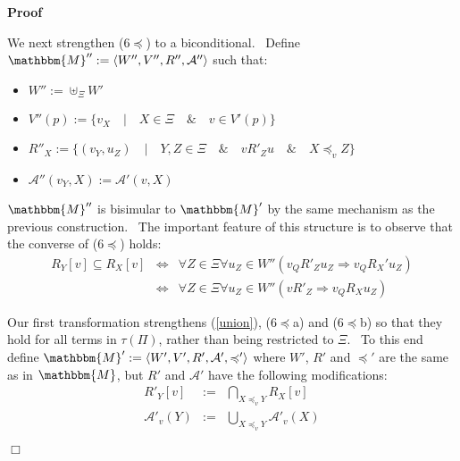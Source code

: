 \documentclass{acmconf}
\newcommand{\assign}{:=}
\newenvironment{itemizedot}{\begin{itemize} \renewcommand{\labelitemi}{$\bullet$}\renewcommand{\labelitemii}{$\bullet$}\renewcommand{\labelitemiii}{$\bullet$}\renewcommand{\labelitemiv}{$\bullet$}}{\end{itemize}}
\newenvironment{proof}{\noindent\textbf{Proof\ }}{\hspace*{\fill}$\Box$\medskip}
\begin{document}
\begin{proof}
  
  
  We next strengthen (6$\preccurlyeq$) to a biconditional. \ Define
  $\mathbbm{M}'' \assign \langle W'', V'', R'', \mathcal{A}'' \rangle$ such
  that:
  \begin{itemizedot}
    \item $W'' \assign \uplus_{\Xi} W'$
    
    \item $V'' (p) \assign \{v_X \hspace{1em} | \hspace{1em} X \in \Xi
    \hspace{1em} \& \hspace{1em} v \in V' (p)\}$
    
    \item $R''_X \assign \{(v_Y, u_Z) \hspace{1em} | \hspace{1em} Y, Z \in \Xi
    \hspace{1em} \& \hspace{1em} v R'_Z u \hspace{1em} \& \hspace{1em} X
    \preccurlyeq_v Z\}$
    
    \item $\mathcal{A}'' (v_Y, X) \assign \mathcal{A}' (v, X)$
  \end{itemizedot}
  $\mathbbm{M}''$ is bisimular to $\mathbbm{M}'$ by the same mechanism as the
  previous construction. \ The important feature of this structure is to
  observe that the converse of (6$\preccurlyeq$) holds:
  \begin{eqnarray*}
    R_Y [v] \subseteq R_X [v] & \Longleftrightarrow & \forall Z \in \Xi
    \forall u_Z \in W'' (v_Q R'_Z u_Z \Longrightarrow v_Q R_X' u_Z)\\
    & \Longleftrightarrow & \forall Z \in \Xi \forall u_Z \in W'' (v R'_Z
    \Longrightarrow v_Q R_X u_Z)
  \end{eqnarray*}
  
  
  Our first transformation strengthens (\ref{union}), (6$\preccurlyeq$a) and
  (6$\preccurlyeq$b) so that they hold for all terms in $\tau (\Pi)$, rather
  than being restricted to $\Xi$. \ To this end define $\mathbbm{M}' \assign
  \langle W', V', R', \mathcal{A}', \preccurlyeq' \rangle$ where $W'$, $R'$
  and $\preccurlyeq'$ are the same as in $\mathbbm{M}$, but $R'$ and
  $\mathcal{A}'$ have the following modifications:
  \begin{eqnarray}
    R'_Y [v] & \assign & \bigcap_{X \preccurlyeq_v Y} R_X [v] \nonumber\\
    \mathcal{A}'_v (Y) & \assign & \bigcup_{X \preccurlyeq_v Y} \mathcal{A}'_v
    (X) \nonumber
  \end{eqnarray}
  
\end{proof}
\end{document}
